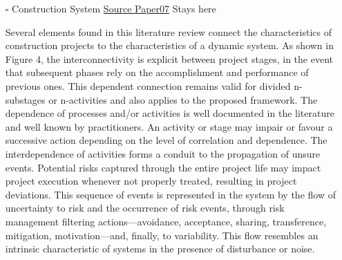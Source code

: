 \documentclass{article}
\begin{document}
\begin{itemize}
\item[{$\square$}] Construction System
\uline{Source Paper07} Stays here

Several elements found in this literature review connect the characteristics of construction projects to the characteristics of a dynamic system.
As shown in Figure 4, the interconnectivity is explicit between project stages, in the event that subsequent phases rely on the accomplishment and performance of previous ones.
This dependent connection remains valid for divided n-substages or n-activities and also applies to the proposed framework.
The dependence of processes and/or activities is well documented in the literature and well known by practitioners.
An activity or stage may impair or favour a successive action depending on the level of correlation and dependence.
The interdependence of activities forms a conduit to the propagation of unsure events. Potential risks captured through the entire project life may impact project execution whenever not properly treated, resulting in project deviations.
This sequence of events is represented in the system by the flow of uncertainty to risk and the occurrence of risk events, through risk management filtering actions—avoidance, acceptance, sharing, transference, mitigation, motivation—and, finally, to variability.
This flow resembles an intrinsic characteristic of systems in the presence of disturbance or noise.


\end{itemize}
\end{document}
